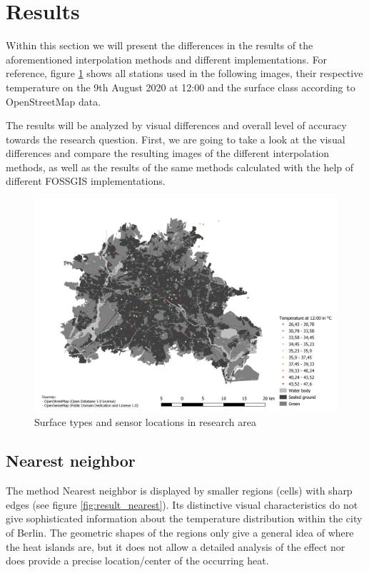 
\section{Results}

Within this section we will present the differences in the results of the aforementioned interpolation methods and different implementations. For reference, figure \ref{fig:result_berlin} shows all stations used in the following images, their respective temperature on the 9th August 2020 at 12:00 and the surface class according to OpenStreetMap data.

The results will be analyzed by visual differences and overall level of accuracy towards the research question. First, we are going to take a look at the visual differences and compare the resulting images of the different interpolation methods, as well as the results of the same methods calculated with the help of different FOSSGIS implementations.

\begin{figure}[H]
	\includegraphics[width=\linewidth]{comparison/berlin.png}
	\caption{Surface types and sensor locations in research area}
	\label{fig:result_berlin}
\end{figure}

\subsection{Nearest neighbor}

The method \ldq{}Nearest neighbor\rdq{} is displayed by smaller regions (cells) with sharp edges  (see figure \ref{fig:result_nearest}). Its distinctive visual characteristics do not give sophisticated information about the temperature distribution within the city of Berlin. The geometric shapes of the regions only give a general idea of where the heat islands are, but it does not allow a detailed analysis of the effect nor does provide a precise location/center of the occurring heat.

